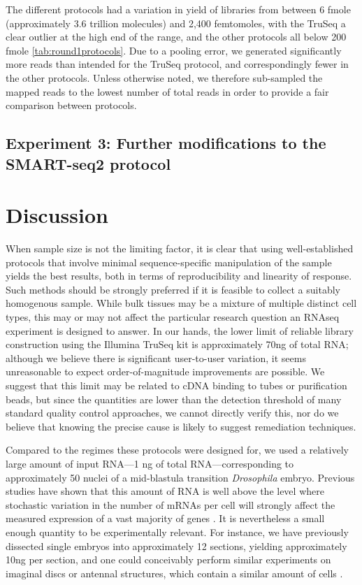 \documentclass[12pt]{article}
\begin{document}
The different protocols had a variation in yield of libraries from between 6 fmole (approximately 3.6 trillion molecules) and 2,400 femtomoles, with the TruSeq a clear outlier at the high end of the range, and the other protocols all below 200 fmole \ref{tab:round1protocols}.  Due to a pooling error, we generated significantly more reads than intended for the TruSeq protocol, and correspondingly fewer in the other protocols. Unless otherwise noted, we therefore sub-sampled the mapped reads to the lowest number of total reads in order to provide a fair comparison between protocols. 



\subsection{Experiment 3: Further modifications to the SMART-seq2 protocol}




\section{Discussion}

When sample size is not the limiting factor, it is clear that using well-established protocols that involve minimal sequence-specific manipulation of the sample yields the best results, both in terms of reproducibility and linearity of response. Such methods should be strongly preferred if it is feasible to collect a suitably homogenous sample. While bulk tissues may be a mixture of multiple distinct cell types, this may or may not affect the particular research question an RNAseq experiment is designed to answer.  In our hands, the lower limit of reliable library construction using the Illumina TruSeq kit is approximately 70ng of total RNA; although we believe there is significant user-to-user variation, it seems unreasonable to expect order-of-magnitude improvements are possible. We suggest that this limit may be related to cDNA binding to tubes or purification beads, but since the quantities are lower than the detection threshold of many standard quality control approaches, we cannot directly verify this, nor do we believe that knowing the precise cause is likely to suggest remediation techniques.

Compared to the regimes these protocols were designed for, we used a relatively large amount of input RNA---1 ng of total RNA---corresponding to approximately 50 nuclei of a mid-blastula transition {\em Drosophila} embryo. Previous studies have shown that this amount of RNA is well above the level where stochastic variation in the number of mRNAs per cell will strongly affect the measured expression of a vast majority of genes \cite{Marinov:2013fm}. It is nevertheless a small enough quantity to be experimentally relevant.  For instance, we have previously dissected single embryos into approximately 12 sections, yielding approximately 10ng per section\cite{Combs:2013jy}, and one could conceivably perform similar experiments on imaginal discs or antennal structures, which contain a similar amount of cells \cite{Klebes:2002ua,Hansson:2000cx}.
\end{document}
